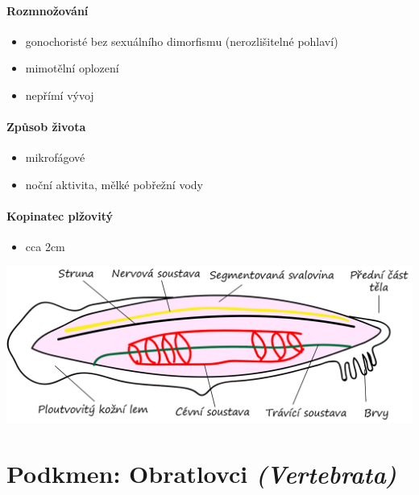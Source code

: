 \paragraph{Rozmnožování}
\begin{itemize}
\item gonochoristé bez sexuálního dimorfismu (nerozlišitelné pohlaví)
\item mimotělní oplození
\item nepřímí vývoj
\end{itemize}

\paragraph{Způsob života}
\begin{itemize}
\item mikrofágové
\item noční aktivita, mělké pobřežní vody
\end{itemize}

\paragraph{Kopinatec plžovitý}
\begin{itemize}
\item cca 2cm
\end{itemize}
\includegraphics[width=1\textwidth]{pictures/kopinatec.png}

\section{Podkmen: Obratlovci \textit{(Vertebrata)}}
